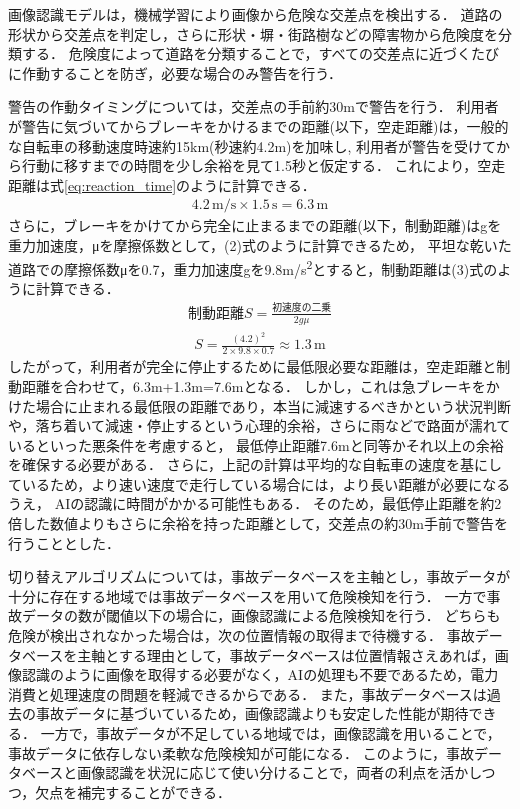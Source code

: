 \documentclass[uplatex,dvipdfmx]{jsarticle}
\begin{document}
画像認識モデルは，機械学習により画像から危険な交差点を検出する．
道路の形状から交差点を判定し，さらに形状・塀・街路樹などの障害物から危険度を分類する．
危険度によって道路を分類することで，すべての交差点に近づくたびに作動することを防ぎ，必要な場合のみ警告を行う．

警告の作動タイミングについては，交差点の手前約30mで警告を行う．
利用者が警告に気づいてからブレーキをかけるまでの距離(以下，空走距離)は，一般的な自転車の移動速度時速約15km(秒速約4.2m)を加味し,
利用者が警告を受けてから行動に移すまでの時間を少し余裕を見て1.5秒と仮定する\cite{ref:bycicle, ref:responsibility}．
これにより，空走距離は式\eqref{eq:reaction_time}のように計算できる．
\begin{align}\label{eq:reaction_time}
4.2\,\mathrm{m/s} \times 1.5\,\mathrm{s} = 6.3\,\mathrm{m}
\end{align}
さらに，ブレーキをかけてから完全に止まるまでの距離(以下，制動距離)はgを重力加速度，μを摩擦係数として，(2)式のように計算できるため，
平坦な乾いた道路での摩擦係数μを0.7，重力加速度gを9.8m/s\textsuperscript{2}とすると，制動距離は(3)式のように計算できる\cite{ref:brake_distance,ref:dry_road}．
\begin{align}
  制動距離S = \frac{初速度の二乗}{2g\mu}
\end{align}
\begin{align}
    S = \frac{(4.2)^2}{2\times9.8\times0.7} \approx 1.3\,\mathrm{m}
\end{align}
したがって，利用者が完全に停止するために最低限必要な距離は，空走距離と制動距離を合わせて，6.3m+1.3m=7.6mとなる．
しかし，これは急ブレーキをかけた場合に止まれる最低限の距離であり，本当に減速するべきかという状況判断や，落ち着いて減速・停止するという心理的余裕，さらに雨などで路面が濡れているといった悪条件を考慮すると，
最低停止距離7.6mと同等かそれ以上の余裕を確保する必要がある．
さらに，上記の計算は平均的な自転車の速度を基にしているため，より速い速度で走行している場合には，より長い距離が必要になるうえ，
AIの認識に時間がかかる可能性もある．
そのため，最低停止距離を約2倍した数値よりもさらに余裕を持った距離として，交差点の約30m手前で警告を行うこととした．

切り替えアルゴリズムについては，事故データベースを主軸とし，事故データが十分に存在する地域では事故データベースを用いて危険検知を行う．
一方で事故データの数が閾値以下の場合に，画像認識による危険検知を行う．
どちらも危険が検出されなかった場合は，次の位置情報の取得まで待機する．
事故データベースを主軸とする理由として，事故データベースは位置情報さえあれば，画像認識のように画像を取得する必要がなく，AIの処理も不要であるため，電力消費と処理速度の問題を軽減できるからである．
また，事故データベースは過去の事故データに基づいているため，画像認識よりも安定した性能が期待できる．
一方で，事故データが不足している地域では，画像認識を用いることで，事故データに依存しない柔軟な危険検知が可能になる．
このように，事故データベースと画像認識を状況に応じて使い分けることで，両者の利点を活かしつつ，欠点を補完することができる．
\end{document}
